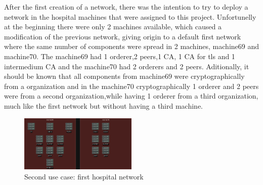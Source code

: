 After the first creation of a network, there was the intention to try to deploy a network in the hospital machines that were assigned to this project. Unfortunelly at the beginning there were only 2 machines available, which caused a modification of the previous network, giving origin to a default first network where the same number of components were spread in 2 machines, machine69 and machine70. The machine69 had 1 orderer,2 peers,1 CA, 1 CA for tls and 1 intermedium CA and the machine70 had 2 orderers and 2 peers. Aditionally, it should be known that all components from machine69 were cryptographically from a organization and in the machine70 cryptographically 1 orderer and 2 peers were from a second organization,while having 1 orderer from a third organization, much like the first network but without having a third machine.
\begin{figure}[H]
    \centering
    \includegraphics[width=0.5\textwidth]{assets/use-case-2/default-first-hospital.drawio.png} %
    \caption{Second use case: first hospital network}
    \label{fig:sample-image} 
\end{figure}

